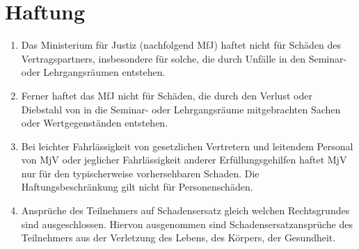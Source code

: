 \documentclass[a4paper, 12pt]{scrartcl}
\begin{document}
    \section{Haftung}
    \begin{enumerate}
	    \item Das Ministerium f\"ur Justiz (nachfolgend MfJ) haftet nicht für Sch\"aden des Vertragspartners, insbesondere f\"ur solche, die durch Unf\"alle in den Seminar- oder Lehrgangsräumen entstehen.
	    
	    \item Ferner haftet das MfJ nicht für Sch\"aden, die durch den Verlust oder Diebstahl von in die Seminar- oder Lehrgangsr\"aume mitgebrachten Sachen oder Wertgegenst\"anden entstehen.
	    
        \item Bei leichter Fahrl\"assigkeit von gesetzlichen Vertretern und leitendem Personal von MjV oder jeglicher Fahrl\"assigkeit anderer Erf\"ullungsgehilfen haftet MjV nur f\"ur den typischerweise vorhersehbaren Schaden.
        Die Haftungsbeschr\"ankung gilt nicht für Personensch\"aden.

        \item Anspr\"uche des Teilnehmers auf Schadensersatz gleich welchen Rechtsgrundes sind ausgeschlossen.
        Hiervon ausgenommen sind Schadensersatzanspr\"uche des Teilnehmers aus der Verletzung des Lebens, des K\"orpers, der Gesundheit.
    \end{enumerate}
    
\end{document}
